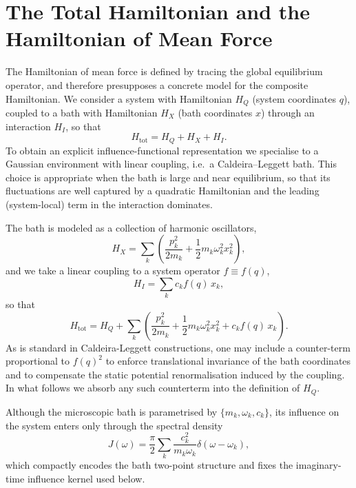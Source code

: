\section{\label{sec:model}The Total Hamiltonian and the Hamiltonian of Mean Force}
The Hamiltonian of mean force is defined by tracing the global equilibrium
operator, and therefore presupposes a concrete model for the composite
Hamiltonian. We consider a system with Hamiltonian $H_Q$ (system coordinates
$q$), coupled to a bath with Hamiltonian $H_X$ (bath coordinates $x$) through an
interaction $H_I$, so that
\begin{equation}
    H_{\mathrm{tot}}=H_Q+H_X+H_I.
    \label{eq:Htot_model}
\end{equation}
To obtain an explicit influence-functional representation we specialise to a
Gaussian environment with linear coupling, i.e.\ a Caldeira--Leggett bath. This
choice is appropriate when the bath is large and near equilibrium, so that its
fluctuations are well captured by a quadratic Hamiltonian and the leading
(system-local) term in the interaction dominates.

The bath is modeled as a collection of harmonic oscillators,
\begin{equation}
    H_X=\sum_k\left(\frac{p_k^2}{2m_k}+\frac{1}{2}m_k\omega_k^2 x_k^2\right),
    \label{eq:HX_model}
\end{equation}
and we take a linear coupling to a system operator $f\equiv f(q)$,
\begin{equation}
    H_I=\sum_k c_k f(q)\, x_k,
    \label{eq:HI_model}
\end{equation}
so that
\begin{equation}
    H_{\mathrm{tot}} = H_Q + \sum_k \left( \frac{p_k^2}{2m_k} + \frac{1}{2}m_k\omega_k^2 x_k^2 + c_k f(q)\, x_k \right).
    \label{eq:Htot_full}
\end{equation}
As is standard in Caldeira-Leggett constructions, one may include a counter-term
proportional to $f(q)^2$ to enforce translational invariance of the bath
coordinates and to compensate the static potential renormalisation induced by
the coupling. In what follows we absorb any such counterterm into the
definition of $H_Q$.

Although the microscopic bath is parametrised by $\{m_k,\omega_k,c_k\}$, its
influence on the system enters only through the spectral density
\begin{equation}
    J(\omega) = \frac{\pi}{2} \sum_k \frac{c_k^2}{m_k \omega_k} \delta(\omega-\omega_k),
    \label{eq:spectral_density}
\end{equation}
which compactly encodes the bath two-point structure and fixes the imaginary-time
influence kernel used below.


